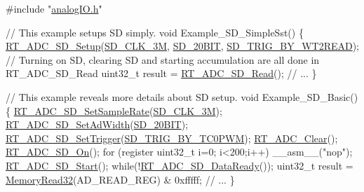 \begin{DoxyCode}
\textcolor{preprocessor}{#include "\mbox{\hyperlink{a00002}{analogIO.h}}"}

\textcolor{comment}{// This example setups SD simply.}
\textcolor{keywordtype}{void} Example\_SD\_SimpleSst()
\{
    \mbox{\hyperlink{a00002_a312f152517ab50c1cda791e118dd4473}{RT\_ADC\_SD\_Setup}}(\mbox{\hyperlink{a00002_aebc3424fa91b715741f0320561ecfbb0a720c5991be73063f5ab035440f26b486}{SD\_CLK\_3M}}, \mbox{\hyperlink{a00002_a44030e617a742aba101c6dcd3ec2078ea3a9f3242e2567dcfb29f566e45cf6de0}{SD\_20BIT}}, 
      \mbox{\hyperlink{a00002_ab266bb772aaf5cffad6bede99cfb094ca9596adcc3a82f8e983e664a6ed5144a6}{SD\_TRIG\_BY\_WT2READ}});
    \textcolor{comment}{// Turning on SD, clearing SD and starting accumulation are all done in RT\_ADC\_SD\_Read}
    uint32\_t result = \mbox{\hyperlink{a00002_a5532ac461de55576a3875b29300c8536}{RT\_ADC\_SD\_Read}}();
    \textcolor{comment}{// ...}
\}

\textcolor{comment}{// This example reveals more details about SD setup.}
\textcolor{keywordtype}{void} Example\_SD\_Basic()
\{
    \mbox{\hyperlink{a00002_a246ce987fa2b9f254f4796340eb23ed0}{RT\_ADC\_SD\_SetSampleRate}}(\mbox{\hyperlink{a00002_aebc3424fa91b715741f0320561ecfbb0a720c5991be73063f5ab035440f26b486}{SD\_CLK\_3M}});
    \mbox{\hyperlink{a00002_acb989d89893ac99af984979cb9e8df2a}{RT\_ADC\_SD\_SetAdWidth}}(\mbox{\hyperlink{a00002_a44030e617a742aba101c6dcd3ec2078ea3a9f3242e2567dcfb29f566e45cf6de0}{SD\_20BIT}});
    \mbox{\hyperlink{a00002_a11bf38478bd196acd1f179115e714dfc}{RT\_ADC\_SD\_SetTrigger}}(\mbox{\hyperlink{a00002_ab266bb772aaf5cffad6bede99cfb094ca2da9ae6568d907b90ab68f56f8605ada}{SD\_TRIG\_BY\_TC0PWM}});
    \mbox{\hyperlink{a00002_a6f788ef3b57dbc478ab10de7356574fa}{RT\_ADC\_Clear}}();
    \mbox{\hyperlink{a00002_a3bb0bbb7c349af23c8e5f1b0d8408a07}{RT\_ADC\_SD\_On}}();
    \textcolor{keywordflow}{for} (\textcolor{keyword}{register} uint32\_t i=0; i<200;i++)
        \_\_asm\_\_(\textcolor{stringliteral}{"nop"});
    \mbox{\hyperlink{a00002_ac75cab97ce7cce47671dd8ef34e920d8}{RT\_ADC\_SD\_Start}}();
    \textcolor{keywordflow}{while}(!\mbox{\hyperlink{a00002_a7fd97b414a33170e6013c88f37e028a9}{RT\_ADC\_SD\_DataReady}}());
    uint32\_t result = \mbox{\hyperlink{a00020_a706b02571285f92589fbb0b964d7d0bb}{MemoryRead32}}(AD\_READ\_REG) & 0xfffff;
    \textcolor{comment}{// ...}
\}
\end{DoxyCode}
 